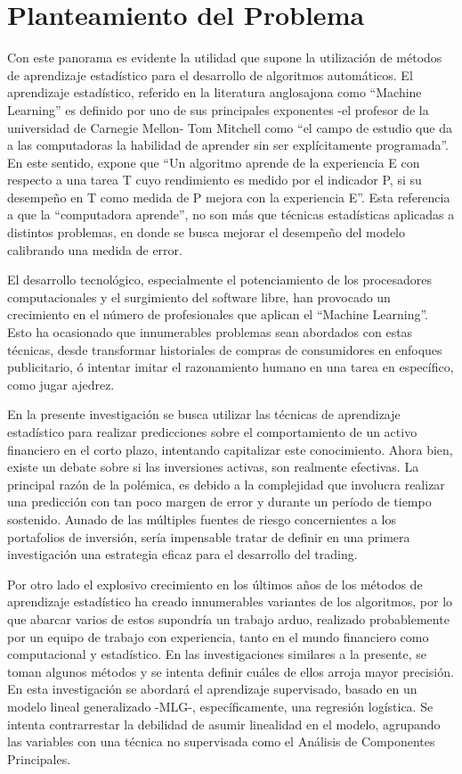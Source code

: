 \documentclass[a4paper,12pt]{Latex/Classes/PhDthesisPSnPDF}
\begin{document}
\section{Planteamiento del Problema}

Con este panorama es evidente la utilidad que supone la utilización de métodos de aprendizaje estadístico para el desarrollo de algoritmos automáticos. El aprendizaje estadístico, referido en la literatura anglosajona como “Machine Learning” es definido por uno de sus principales exponentes -el profesor de la universidad de Carnegie Mellon- Tom Mitchell como “el campo de estudio que da a las computadoras la habilidad de aprender sin ser explícitamente programada”. En este sentido, expone que “Un algoritmo aprende de la experiencia E con respecto a una tarea T cuyo rendimiento es medido por el indicador P, si su desempeño en T como medida de P mejora con la experiencia E”. Esta referencia a que la “computadora aprende”, no son más que técnicas estadísticas aplicadas a distintos problemas, en donde se busca mejorar el desempeño del modelo calibrando una medida de error.

El desarrollo tecnológico, especialmente el potenciamiento de los procesadores computacionales y el surgimiento del software libre, han provocado un crecimiento en el número de profesionales que aplican el “Machine Learning”. Esto ha ocasionado que innumerables problemas sean abordados con estas técnicas, desde transformar historiales de compras de consumidores en enfoques publicitario, ó intentar imitar el razonamiento humano en una tarea en específico, como jugar ajedrez.

En la presente investigación se busca utilizar las técnicas de aprendizaje estadístico para realizar predicciones sobre el comportamiento de un activo financiero en el corto  plazo, intentando capitalizar este conocimiento. Ahora bien, existe un debate sobre si las inversiones activas, son realmente efectivas. La principal razón de la polémica, es debido a la complejidad que involucra realizar una predicción con tan poco margen de error y durante un período de tiempo sostenido. Aunado de las múltiples fuentes de riesgo concernientes a los portafolios de inversión, sería impensable tratar de definir en una primera investigación una estrategia eficaz para el desarrollo del trading.

Por otro lado el explosivo crecimiento en los últimos años de los métodos de aprendizaje estadístico ha creado innumerables variantes de los algoritmos, por lo que abarcar varios de estos supondría un trabajo arduo, realizado probablemente por un equipo de trabajo con experiencia, tanto en el mundo financiero como computacional y estadístico. En las investigaciones similares a la presente, se toman algunos métodos y se intenta definir cuáles de ellos arroja mayor precisión. En esta investigación se abordará el aprendizaje supervisado, basado en un modelo lineal generalizado -MLG-, específicamente, una regresión logística. Se intenta contrarrestar la debilidad de asumir linealidad en el modelo, agrupando las variables con una técnica no supervisada como el Análisis de Componentes Principales.
\end{document}
